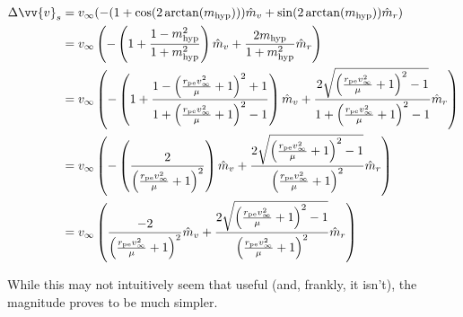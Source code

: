\documentclass[../basicOrbitalDynamics.tex]{subfiles}
\begin{document}
\begin{align*}
    \Delta\vv{v}_s & = v_\infty(-(1+\cos(2\arctan(\st{m}{hyp})))\hat{m}_v+\sin(2\arctan(\st{m}{hyp}))\hat{m}_r)                                                                                                                                                                                                               \\
                   & = v_\infty\left(-\left(1+\frac{1-\st{m}{hyp}^2}{1+\st{m}{hyp}^2}\right)\hat{m}_v+\frac{2\st{m}{hyp}}{1+\st{m}{hyp}^2}\hat{m}_r\right)                                                                                                                                                                  \\
                   & = v_\infty\left(-\left(1+\frac{1-\left(\frac{\st{r}{pe}v_\infty^2}{\mu}+1\right)^2+1}{1+\left(\frac{\st{r}{pe}v_\infty^2}{\mu}+1\right)^2-1}\right)\hat{m}_v+\frac{2\sqrt{\left(\frac{\st{r}{pe}v_\infty^2}{\mu}+1\right)^2-1}}{1+\left(\frac{\st{r}{pe}v_\infty^2}{\mu}+1\right)^2-1}\hat{m}_r\right) \\
                   & = v_\infty\left(-\left(\frac{2}{\left(\frac{\st{r}{pe}v_\infty^2}{\mu}+1\right)^2}\right)\hat{m}_v+\frac{2\sqrt{\left(\frac{\st{r}{pe}v_\infty^2}{\mu}+1\right)^2-1}}{\left(\frac{\st{r}{pe}v_\infty^2}{\mu}+1\right)^2}\hat{m}_r\right)                                                                \\
                   & = v_\infty\left(\frac{-2}{\left(\frac{\st{r}{pe}v_\infty^2}{\mu}+1\right)^2}\hat{m}_v+\frac{2\sqrt{\left(\frac{\st{r}{pe}v_\infty^2}{\mu}+1\right)^2-1}}{\left(\frac{\st{r}{pe}v_\infty^2}{\mu}+1\right)^2}\hat{m}_r\right)                                                                             \\
\end{align*}

While this may not intuitively seem that useful (and, frankly, it isn't), the magnitude proves to be much simpler.
\end{document}
